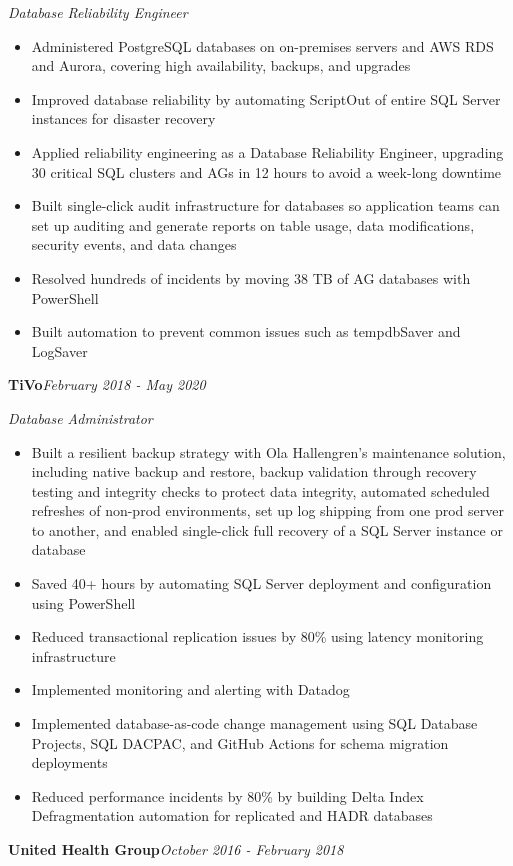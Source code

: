 \documentclass[10pt,a4paper]{article}
\begin{document}
\textit{Database Reliability Engineer}\\[-5pt]
\begin{itemize}
  \item Administered PostgreSQL databases on on-premises servers and AWS RDS and Aurora, covering high availability, backups, and upgrades
  \item Improved database reliability by automating ScriptOut of entire SQL Server instances for disaster recovery
  \item Applied reliability engineering as a Database Reliability Engineer, upgrading 30 critical SQL clusters and AGs in 12 hours to avoid a week-long downtime
  \item Built single-click audit infrastructure for databases so application teams can set up auditing and generate reports on table usage, data modifications, security events, and data changes
  \item Resolved hundreds of incidents by moving 38 TB of AG databases with PowerShell
  \item Built automation to prevent common issues such as tempdbSaver and LogSaver
\end{itemize}
\vspace{14.7pt}
\noindent\textbf{TiVo}\hfill \textit{February 2018 - May 2020}

\textit{Database Administrator}\\[-5pt]
\begin{itemize}
  \item Built a resilient backup strategy with Ola Hallengren's maintenance solution, including native backup and restore, backup validation through recovery testing and integrity checks to protect data integrity, automated scheduled refreshes of non-prod environments, set up log shipping from one prod server to another, and enabled single-click full recovery of a SQL Server instance or database
  \item Saved 40+ hours by automating SQL Server deployment and configuration using PowerShell
  \item Reduced transactional replication issues by 80\% using latency monitoring infrastructure
  \item Implemented monitoring and alerting with Datadog
  \item Implemented database-as-code change management using SQL Database Projects, SQL DACPAC, and GitHub Actions for schema migration deployments
  \item Reduced performance incidents by 80\% by building Delta Index Defragmentation automation for replicated and HADR databases
\end{itemize}
\vspace{14.7pt}
\noindent\textbf{United Health Group}\hfill \textit{October 2016 - February 2018}
\end{document}
